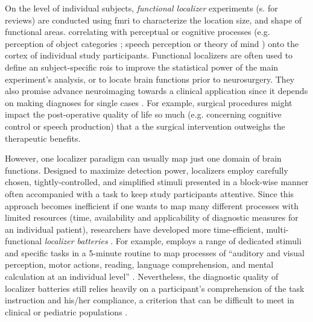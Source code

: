 

On the level of individual subjects, \textit{functional localizer} experiments
(s. \citep{saxe2006divide, friston2006critique} for reviews) are conducted using
\ac{fmri} to characterize the location size, and shape of functional areas.
correlating with perceptual or cognitive processes (e.g. perception of object
categories \citet{kanwisher1997ffa}; speech perception
\citet{fernandez2001language} or theory of mind \citep{spunt2014validating})
onto the cortex of individual study participants.
Functional localizers are often used to define an subject-specific \acp{roi} to
improve the statistical power of the main experiment's analysis, or to locate
brain functions prior to neurosurgery.
They also promise advance neuroimaging towards a clinical application since it
depends on making diagnoses for single cases
\citep{wegrzyn2018thought}.
For example, surgical procedures might impact the post-operative quality of life
so much (e.g. concerning cognitive control or speech production) that a the
surgical intervention outweighs the therapeutic benefits.

However, one localizer paradigm can usually map just one domain of brain
functions.
Designed to maximize detection power, localizers employ carefully chosen,
tightly-controlled, and simplified stimuli presented in a block-wise manner
often accompanied with a task to keep study participants attentive.
Since this approach becomes inefficient if one wants to map many different
processes with limited resources (time, availability and applicability of
diagnostic measures for an individual patient), researchers have developed more
time-efficient, multi-functional \textit{localizer batteries}
\citep{barch2013function, drobyshevsky2006rapid, pinel2007fast}.
For example, \citet{pinel2007fast} employs a range of dedicated stimuli and
specific tasks in a 5-minute routine to map processes of ``auditory and visual
perception, motor actions, reading, language comprehension, and mental
calculation at an individual level'' \citet{pinel2007fast}.
Nevertheless, the diagnostic quality of localizer batteries still relies heavily
on a participant's comprehension of the task instruction and his/her compliance,
a criterion that can be difficult to meet in clinical or pediatric populations
\citep{eickhoff2020towards, vanderwal2015inscapes, vanderwal2019movies}.



